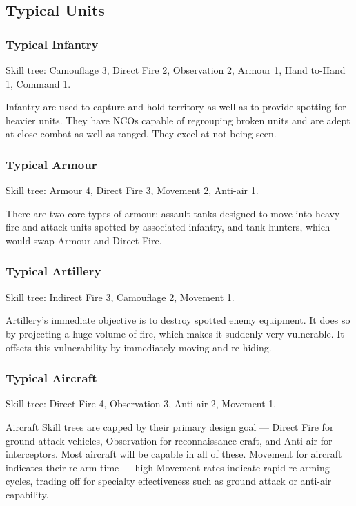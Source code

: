 \subsection{Typical Units}
\label{sec:typical-units}



\vfil

\subsubsection{Typical Infantry}

Skill tree: Camouflage 3, Direct Fire 2, Observation 2, Armour 1, Hand to-Hand 1, Command 1.

Infantry are used to capture and hold territory as well as to provide spotting for heavier units.  They have NCOs capable of regrouping broken units and are adept at close combat as well as ranged. They excel at not being seen.

\subsubsection{Typical Armour}

Skill tree: Armour 4, Direct Fire 3, Movement 2, Anti-air 1.

There are two core types of armour: assault tanks designed to move into heavy fire and attack units spotted by associated infantry, and tank hunters, which would swap Armour and Direct Fire.

\vfil

\subsubsection{Typical Artillery}

Skill tree: Indirect Fire 3, Camouflage 2, Movement 1.

Artillery's immediate objective is to destroy spotted enemy equipment. It does so by projecting a huge volume of fire, which makes it suddenly very vulnerable. It offsets this vulnerability by immediately moving and re-hiding.

\subsubsection{Typical Aircraft}

Skill tree: Direct Fire 4, Observation 3, Anti-air 2, Movement 1.

Aircraft Skill trees are capped by their primary design goal --- Direct Fire for ground attack vehicles, Observation for reconnaissance craft, and Anti-air for interceptors. Most aircraft will be capable in all of these. Movement for aircraft indicates their re-arm time --- high Movement rates indicate rapid re-arming cycles, trading off for specialty effectiveness such as ground attack or anti-air capability.
